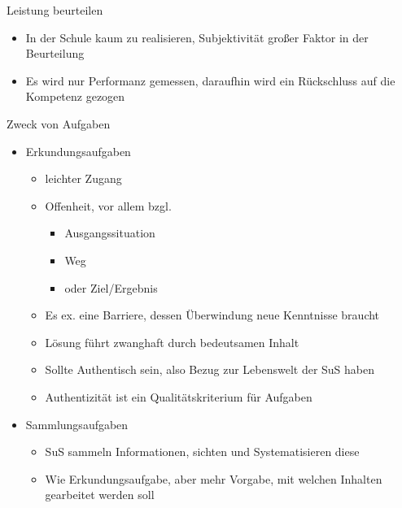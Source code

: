 \documentclass{article}
\begin{document}
\begin{block}{Leistung beurteilen}
\begin{itemize}
\begin{itemize}
            \item Reliabilität: Bei den gleichen Leistung ist die Bewertung immer gleich
            \item Validität: Die Leistung misst auch das, was sie messen soll
        \end{itemize}
        \item In der Schule kaum zu realisieren, Subjektivität großer Faktor in der Beurteilung
        \item Es wird nur Performanz gemessen, daraufhin wird ein Rückschluss auf die Kompetenz gezogen
    \end{itemize}
\end{block}

\begin{block}{Zweck von Aufgaben}
    \begin{itemize}
        \item Erkundungsaufgaben
        \begin{itemize}
            \item leichter Zugang
            \item Offenheit, vor allem bzgl.
            \begin{itemize}
                \item Ausgangssituation
                \item Weg
                \item oder Ziel/Ergebnis
            \end{itemize}
            \item Es ex. eine Barriere, dessen Überwindung neue Kenntnisse braucht
            \item Lösung führt zwanghaft durch bedeutsamen Inhalt
            \item Sollte Authentisch sein, also Bezug zur Lebenswelt der SuS haben
            \item Authentizität ist ein Qualitätskriterium für Aufgaben
        \end{itemize}
        \item Sammlungsaufgaben
        \begin{itemize}
            \item SuS sammeln Informationen, sichten und Systematisieren diese
            \item Wie Erkundungsaufgabe, aber mehr Vorgabe, mit welchen Inhalten gearbeitet werden soll
        \end{itemize}
    \end{itemize}
\end{block}
\end{document}
